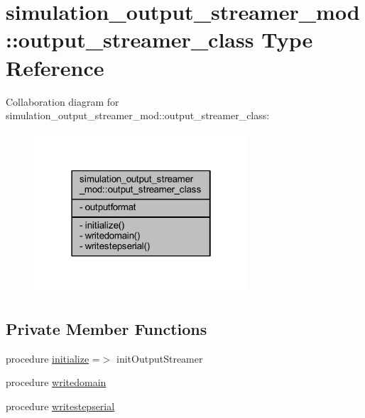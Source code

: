 \hypertarget{structsimulation__output__streamer__mod_1_1output__streamer__class}{}\section{simulation\+\_\+output\+\_\+streamer\+\_\+mod\+:\+:output\+\_\+streamer\+\_\+class Type Reference}
\label{structsimulation__output__streamer__mod_1_1output__streamer__class}


Collaboration diagram for simulation\+\_\+output\+\_\+streamer\+\_\+mod\+:\+:output\+\_\+streamer\+\_\+class\+:\nopagebreak
\begin{figure}[H]
\begin{center}
\leavevmode
\includegraphics[width=226pt]{structsimulation__output__streamer__mod_1_1output__streamer__class__coll__graph}
\end{center}
\end{figure}
\subsection*{Private Member Functions}
\begin{DoxyCompactItemize}
\item 
procedure \mbox{\hyperlink{structsimulation__output__streamer__mod_1_1output__streamer__class_a374b9843dccfbc1c9395946fa36e17a9}{initialize}} =$>$ init\+Output\+Streamer
\item 
procedure \mbox{\hyperlink{structsimulation__output__streamer__mod_1_1output__streamer__class_a39baf48b09c72aa0b4864200e01a179f}{writedomain}}
\item 
procedure \mbox{\hyperlink{structsimulation__output__streamer__mod_1_1output__streamer__class_a6b886d232b22c9b3328d0b0322ede0bf}{writestepserial}}
\end{DoxyCompactItemize}
